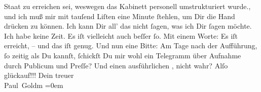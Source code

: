 \begin{ledgroupsized}[t]{13cm}
{{{                  Staat zu erreichen sei, weswegen das Kabinett personell umstrukturiert wurde.}}}\label{K_L02720-2h}, und ich
               muß mir mit tauſend Liſten eine Minute ſtehlen, um Dir die Hand drücken zu können.
                  {\pb}Ich kann Dir all’ das nicht ſagen, was ich Dir
               ſagen möchte. Ich habe keine Zeit. Es iſt vielleicht auch beſſer ſo. Mit einem Worte:
               Es iſt erreicht, – und das iſt genug. Und \strikeout{\textcolor{gray}{×}\-\textcolor{gray}{×}\-\textcolor{gray}{×}{ }\textcolor{gray}{×}\-\textcolor{gray}{×}\-\textcolor{gray}{×}\-\textcolor{gray}{×}\-\textcolor{gray}{×}} nun eine Bitte: Am Tage nach der Aufführung, ſo zeitig als Du
               kannſt, ſchickſt Du mir wohl ein Telegramm über Aufnahme durch Publicum und Preſſe?
               Und einen ausführlichen {\pb}\label{K_L02720-3v}\label{K_L02720-3h}, nicht wahr?\pend
           \pstart
           Alſo glückauf!!!\pend
           \pstart
           Dein treuer {\\[\baselineskip]}\spacefill\mbox{Paul Goldm}\pend
           \leftskip=0em{}
         
         \endnumbering{}\end{ledgroupsized}  \newcommand{\dateiname}{L02720}\newcommand{\titel}{Paul Goldmann an Arthur Schnitzler, 28. 11. [1893]}\newcommand{\editorInnen}{Martin Anton Müller und Laura Untner}
      